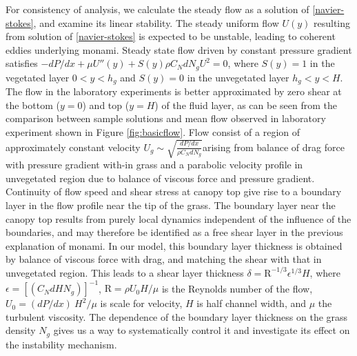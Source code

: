 \documentclass[aps,prl,twocolumn,showpacs,superscriptaddress,groupedaddress,10pt]{revtex4-1}  %
\newcommand{\hg}{h_g}
\newcommand{\Rey}{\text{R}}
\begin{document}
For consistency of analysis, we calculate the steady flow as a solution of \eqref{navier-stokes}, and examine its linear stability. The steady uniform flow $U(y)$ resulting from solution of \eqref{navier-stokes} is expected to be unstable, leading to coherent eddies underlying monami. Steady state flow driven by constant pressure gradient satisfies
$-{dP}/{dx}+\mu U''(y) +S(y) \rho C_N d N_gU^2=0$, where $S(y)=1$ in the vegetated layer $0<y<\hg$ and $S(y)=0$ in the unvegetated layer $\hg< y< H$. 
The flow in the laboratory experiments is better approximated by zero shear at the bottom ($y=0$) and top ($y=H$) of the fluid layer, as can be seen from the comparison 
between sample solutions and mean flow observed in laboratory experiment shown in Figure \ref{fig:basicflow}. Flow consist of a region of approximately constant velocity
\small$U_g \sim \sqrt{\frac{dP/dx}{\rho C_N dN_g}}$\normalsize arising from balance of drag force with pressure gradient with-in grass and a parabolic velocity 
profile in unvegetated region due to balance of viscous force and pressure gradient. Continuity of flow speed and shear stress at canopy top 
give rise to a boundary layer in the flow profile near the tip of the grass. The boundary layer near the canopy top results from purely local dynamics independent of the influence of the boundaries, and may therefore be identified as a free shear layer\cite{Ghisal02} in the previous explanation of monami. 
In our model, this boundary layer thickness is obtained by balance of viscous force with drag, and matching the shear with that in unvegetated region. This leads to a shear layer 
thickness $\delta = \Rey^{-1/3} \epsilon^{1/3} H$, where $\epsilon = \left[(C_N d H N_g)\right]^{-1}$, $\Rey=\rho U_0 H/\mu$ is the Reynolds number of the flow, $U_0 = {(dP/dx)~H^2}/{\mu}$ is scale for velocity,
$H$ is half channel width, and $\mu$ the turbulent viscosity. The dependence of the boundary layer thickness on the grass density $N_g$ gives us a way to systematically control it and investigate its effect on the instability mechanism. 
\end{document}
